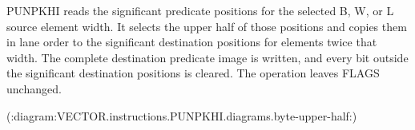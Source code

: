 PUNPKHI reads the significant predicate positions for the selected B, W, or L
source element width.  It selects the upper half of those positions and copies
them in lane order to the significant destination positions for elements twice
that width.  The complete destination predicate image is written, and every bit
outside the significant destination positions is cleared.  The operation leaves FLAGS
unchanged.

(:diagram:VECTOR.instructions.PUNPKHI.diagrams.byte-upper-half:)
